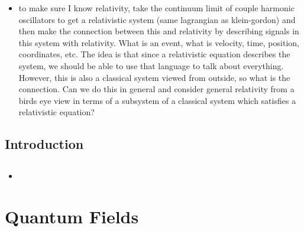 \documentclass{book}
\begin{document}
\begin{itemize}
		\item to make sure I know relativity, take the continuum limit of couple harmonic oscillators to get a relativistic system (same lagrangian as klein-gordon) and then make the connection between this and relativity by describing signals in this system with relativity. What is an event, what is velocity, time, position, coordinates, etc. The idea is that since a relativistic equation describes the system, we should be able to use that language to talk about everything. However, this is also a classical system viewed from outside, so what is the connection. Can we do this in general and consider general relativity from a birds eye view in terms of a subsystem of a classical system which satisfies a relativistic equation?
	\end{itemize}
	
	\section{Introduction}
	
	
	
	\section{}
	
	
	
	\begin{itemize}
		\item {}
	\end{itemize}
	
	
	
	
	
	
	
	
	
	
	
	
	
	
	
	
	
	
	
	
	\newpage
	\chapter{Quantum Fields}
	
\end{document}
